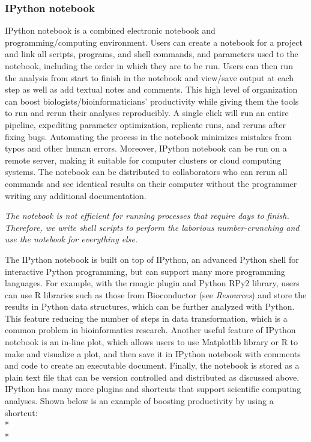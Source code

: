 \documentclass[ChapterTOCs,krantz2]{krantz} %
\begin{document}
\subsubsection{IPython notebook}

IPython notebook is a combined
electronic notebook and programming/computing environment.  
Users can create a notebook for a project and link all scripts,
programs, and shell commands, and parameters used to the notebook, including
the order in which they are to be run.  Users can then run the analysis from start to
finish in the notebook and view/save output at each step as well as add textual
notes and comments.   This high level of organization can boost
biologists/bioinformaticians' productivity while giving them the tools to run
and rerun their analyses reproducibly.  A single click will run an entire
pipeline, expediting parameter optimization, replicate runs, and reruns after
fixing bugs.  Automating the process in the notebook minimizes mistakes from
typos and other human errors.  Moreover, IPython notebook can be run on a
remote server, making it suitable for computer clusters or
cloud computing systems. The notebook can be distributed to
collaborators who can rerun all commands and see identical results on their
computer without the programmer writing any additional documentation.

\textsl{The notebook is not efficient
for running processes that require days to finish.  Therefore, we write
shell scripts to perform the laborious number-crunching and use the notebook
for everything else.}

The IPython notebook is built on top of IPython, an advanced Python shell for
interactive Python programming, but can support many more programming
languages.
For example, with the rmagic plugin and Python RPy2 library, users can
use R libraries such as those from Bioconductor (see \emph{Resources})
and store the results in Python data structures, which can be further analyzed 
with Python.
This feature reducing the number of steps in
data transformation, which is a common problem in
bioinformatics research.
Another useful feature of IPython notebook is an in-line plot, which allows
users to use Matplotlib library or R to make and visualize a plot, and then save it
in IPython notebook with comments and code to create an executable document.
Finally, the notebook is stored as a plain text file that can be version controlled
and distributed as discussed above.
IPython has many more plugins and shortcuts that support scientific
computing analyses.
Shown below is an example of boosting productivity by using a shortcut:\\*\\*
\end{document}
